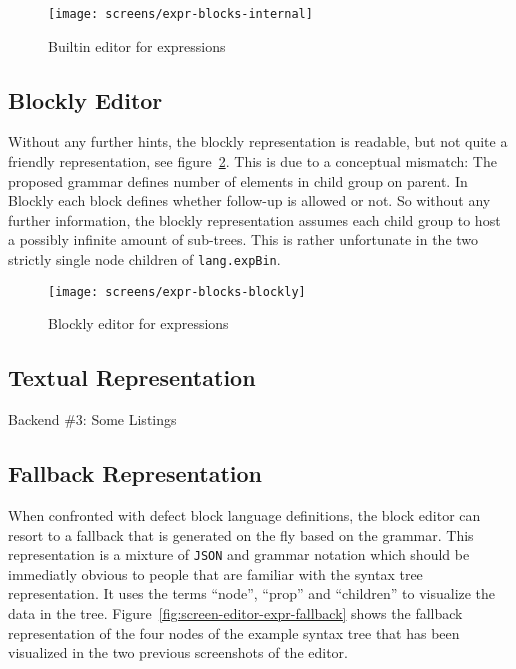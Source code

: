 \documentclass[sigconf,review=true]{acmart}
\begin{document}
\begin{figure}
  \texttt{[image: screens/expr-blocks-internal]}
  \caption{Builtin editor for expressions}
  \label{fig:screen-editor-expr-internal}
\end{figure}

\subsection{Blockly Editor}

Without any further hints, the blockly representation is readable, but not quite a friendly representation, see figure~\ref{fig:screen-editor-expr-blockly}. This is due to a conceptual mismatch: The proposed grammar defines number of elements in child group on parent. In Blockly each block defines whether follow-up is allowed or not. So without any further information, the blockly representation assumes each child group to host a possibly infinite amount of sub-trees. This is rather unfortunate in the two strictly single node children of \texttt{lang.expBin}.

\begin{figure}
  \texttt{[image: screens/expr-blocks-blockly]}
  \caption{Blockly editor for expressions}
  \label{fig:screen-editor-expr-blockly}
\end{figure}

\subsection{Textual Representation}

Backend \#3: Some Listings

\subsection{Fallback Representation}

When confronted with defect block language definitions, the block editor can resort to a fallback that is generated on the fly based on the grammar. This representation is a mixture of \texttt{JSON} and grammar notation which should be immediatly obvious to people that are familiar with the syntax tree representation. It uses the terms \enquote{node}, \enquote{prop} and \enquote{children} to visualize the data in the tree. Figure~\ref{fig:screen-editor-expr-fallback} shows the fallback representation of the four nodes of the example syntax tree that has been visualized in the two previous screenshots of the editor.
\end{document}
